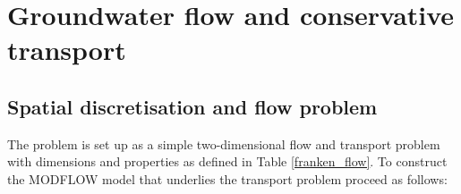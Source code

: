 \section[Groundwater flow and conservative transport]{Groundwater flow and conservative transport}

\subsection[Spatial discretisation and flow problem]{Spatial discretisation and flow problem}

The problem is set up as a simple two-dimensional flow and transport problem with dimensions and properties as defined in Table \ref{franken_flow}. To construct the MODFLOW model that underlies the transport problem proceed as follows:




